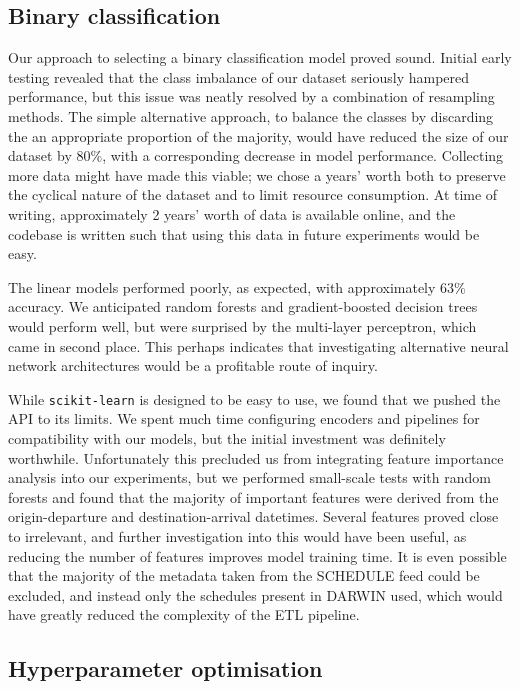 \documentclass[12pt,a4paper]{article}
\begin{document}
\subsection{Binary classification}

Our approach to selecting a binary classification model proved sound. Initial early testing revealed that the class imbalance of our dataset seriously hampered performance, but this issue was neatly resolved by a combination of resampling methods. The simple alternative approach, to balance the classes by discarding the an appropriate proportion of the majority, would have reduced the size of our dataset by $80\%$, with a corresponding decrease in model performance. Collecting more data might have made this viable; we chose a years' worth both to preserve the cyclical nature of the dataset and to limit resource consumption. At time of writing, approximately 2 years' worth of data is available online, and the codebase is written such that using this data in future experiments would be easy. 

The linear models performed poorly, as expected, with approximately $63\%$ accuracy. We anticipated random forests and gradient-boosted decision trees would perform well, but were surprised by the multi-layer perceptron, which came in second place. This perhaps indicates that investigating alternative neural network architectures would be a profitable route of inquiry. 

While \verb|scikit-learn| is designed to be easy to use, we found that we pushed the API to its limits. We spent much time configuring encoders and pipelines for compatibility with our models, but the initial investment was definitely worthwhile. Unfortunately this precluded us from integrating feature importance analysis into our experiments, but we performed small-scale tests with random forests and found that the majority of important features were derived from the origin-departure and destination-arrival datetimes. Several features proved close to irrelevant, and further investigation into this would have been useful, as reducing the number of features improves model training time. It is even possible that the majority of the metadata taken from the SCHEDULE feed could be excluded, and instead only the schedules present in DARWIN used, which would have greatly reduced the complexity of the ETL pipeline.

\subsection{Hyperparameter optimisation}
\end{document}
